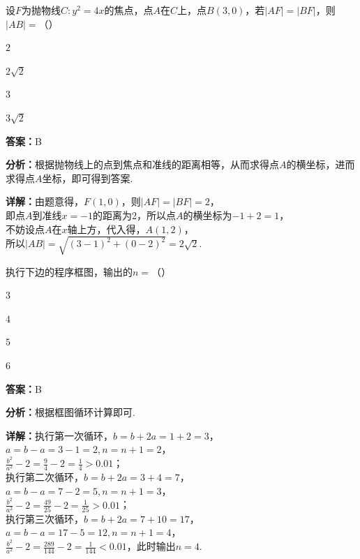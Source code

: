 \begin{question}[points=5]
设$F$为抛物线$C: y^2 = 4x$的焦点，点$A$在$C$上，点$B(3, 0)$，若$|AF| = |BF|$，则$|AB| =$（\qquad）
\begin{choices}
  \item $2$
  \item $2\sqrt{2}$
  \item $3$
  \item $3\sqrt{2}$
\end{choices}
\begin{solution}
\textbf{答案：}B

\textbf{分析：}根据抛物线上的点到焦点和准线的距离相等，从而求得点$A$的横坐标，进而求得点$A$坐标，即可得到答案.

\textbf{详解：}由题意得，$F(1,0)$，则$|AF| = |BF| = 2$，\\即点$A$到准线$x=-1$的距离为2，所以点$A$的横坐标为$-1+2=1$，\\不妨设点$A$在$x$轴上方，代入得，$A(1,2)$，\\所以$|AB| = \sqrt{(3-1)^2 + (0-2)^2} = 2\sqrt{2}$.
\end{solution}
\end{question}

\begin{question}[points=5]
执行下边的程序框图，输出的$n =$（\qquad）
\begin{choices}
  \item $3$
  \item $4$
  \item $5$
  \item $6$
\end{choices}
\begin{solution}
\textbf{答案：}B

\textbf{分析：}根据框图循环计算即可.

\textbf{详解：}执行第一次循环，$b = b + 2a = 1 + 2 = 3$，\\$a = b - a = 3 - 1 = 2, n = n + 1 = 2$，\\$\frac{b^2}{a^2} - 2 = \frac{9}{4} - 2 = \frac{1}{4} > 0.01$；\\执行第二次循环，$b = b + 2a = 3 + 4 = 7$，\\$a = b - a = 7 - 2 = 5, n = n + 1 = 3$，\\$\frac{b^2}{a^2} - 2 = \frac{49}{25} - 2 = \frac{1}{25} > 0.01$；\\执行第三次循环，$b = b + 2a = 7 + 10 = 17$，\\$a = b - a = 17 - 5 = 12, n = n + 1 = 4$，\\$\frac{b^2}{a^2} - 2 = \frac{289}{144} - 2 = \frac{1}{144} < 0.01$，此时输出$n=4$.
\end{solution}
\end{question}

